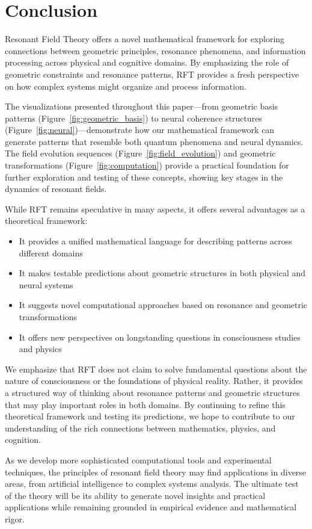 \documentclass[12pt,letterpaper]{article}
\begin{document}
\section{Conclusion}
\label{sec:conclusion}

Resonant Field Theory offers a novel mathematical framework for exploring connections between geometric principles, resonance phenomena, and information processing across physical and cognitive domains. By emphasizing the role of geometric constraints and resonance patterns, RFT provides a fresh perspective on how complex systems might organize and process information.

The visualizations presented throughout this paper—from geometric basis patterns (Figure~\ref{fig:geometric_basis}) to neural coherence structures (Figure~\ref{fig:neural})—demonstrate how our mathematical framework can generate patterns that resemble both quantum phenomena and neural dynamics. The field evolution sequences (Figure~\ref{fig:field_evolution}) and geometric transformations (Figure~\ref{fig:computation}) provide a practical foundation for further exploration and testing of these concepts, showing key stages in the dynamics of resonant fields.

While RFT remains speculative in many aspects, it offers several advantages as a theoretical framework:

\begin{itemize}
    \item It provides a unified mathematical language for describing patterns across different domains
    \item It makes testable predictions about geometric structures in both physical and neural systems
    \item It suggests novel computational approaches based on resonance and geometric transformations
    \item It offers new perspectives on long\-standing questions in consciousness studies and physics
\end{itemize}

We emphasize that RFT does not claim to solve fundamental questions about the nature of consciousness or the foundations of physical reality. Rather, it provides a structured way of thinking about resonance patterns and geometric structures that may play important roles in both domains. By continuing to refine this theoretical framework and testing its predictions, we hope to contribute to our understanding of the rich connections between mathematics, physics, and cognition.

As we develop more sophisticated computational tools and experimental techniques, the principles of resonant field theory may find applications in diverse areas, from artificial intelligence to complex systems analysis. The ultimate test of the theory will be its ability to generate novel insights and practical applications while remaining grounded in empirical evidence and mathematical rigor.



\end{document}
